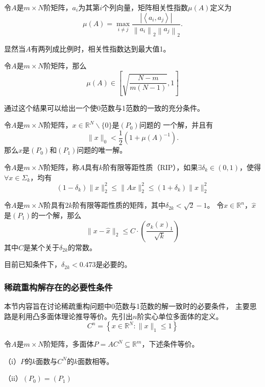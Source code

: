 \begin{definition}
    令$A$是$m\times N$阶矩阵，$a_i$为其第$i$个列向量，矩阵相关性指数$\mu (A)$定义为
    \begin{equation}
        \mu(A)=\max _{i \neq j} \frac{\left|\left\langle a_i, a_j\right\rangle\right|}{\left\|a_i\right\|_2\left\|a_j\right\|_2} .
    \end{equation}
\end{definition}
显然当$A$有两列成比例时，相关性指数达到最大值1。
\begin{lemma}
    令$A$是$m\times N$阶矩阵，那么
    \begin{equation}
        \mu(A) \in\left[\sqrt{\frac{N-m}{m(N-1)}}, 1\right]
    \end{equation}
\end{lemma}
通过这个结果可以给出一个使0范数与1范数的一致的充分条件。
\begin{theorem}
    令$A$是$m\times N$阶矩阵，$x \in \mathbb{R}^N \backslash\{0\}$是$(P_0)$问题的
    一个解，并且有
    \begin{equation}
        \|x\|_0<\frac{1}{2}\left(1+\mu(A)^{-1}\right) .
    \end{equation}
    那么$x$是$(P_0)$和$(P_1)$问题的唯一解。
\end{theorem}

\begin{definition}
    令$A$是$m\times N$阶矩阵，称$A$具有$k$阶有限等距性质（RIP），如果$\exists \delta_k
    \in (0,1)$，使得$\forall x \in \Sigma_k$，均有
    \begin{equation}
        \left(1-\delta_k\right)\|x\|_2^2 \leq\|A x\|_2^2 \leq\left(1+\delta_k\right)\|x\|_2^2
    \end{equation}
\end{definition}
\begin{theorem}
    令$A$是$m\times N$阶具有$2k$阶有限等距性质的矩阵，其中$\delta_{2 k}<\sqrt{2} -1$。
    令$x \in \mathbb{R}^n$，$\hat{x}$是$(P_1)$的一个解，那么
    \begin{equation}
        \|x-\hat{x}\|_2 \leq C \cdot\left(\frac{\sigma_k(x)_1}{\sqrt{k}}\right)
    \end{equation}
    其中$C$是某个关于$\delta_{2 k}$的常数。
\end{theorem}
目前已知条件下，$\delta_{2 k}<0.473$是必要的。
\subsubsection{稀疏重构解存在的必要性条件}
本节内容旨在讨论稀疏重构问题中0范数与1范数的解一致时的必要条件，
主要思路是利用凸多面体理论推导等价。先引出$n$阶实心单位多面体的定义。
\begin{equation}
    C^n=\left\{x \in \mathbb{R}^N:\|x\|_1 \leq 1\right\}
\end{equation}
\begin{theorem}
    令$A$是$m\times N$阶矩阵，多面体$P=A C^N \subseteq \mathbb{R}^m$，下述条件等价。\par
    （i）$P$的$k$面数与$C^N$的$k$面数相等。\par
    （ii）$(P_0)=(P_1)$
\end{theorem}

